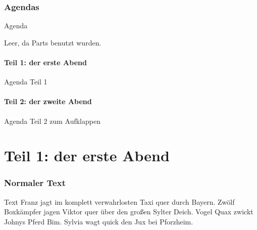 	\section*{Agendas}

	\begin{frame}{Agenda}
		\tableofcontents

		Leer, da Parts benutzt wurden.
	\end{frame}


	\subsection*{Teil 1: der erste Abend}

	\begin{frame}{Agenda Teil 1}
		\tableofcontents[part=1, subsectionstyle=hide]
	\end{frame}


	\subsection*{Teil 2: der zweite Abend}

	\begin{frame}{Agenda Teil 2 zum Aufklappen}
		\tableofcontents[part=2, pausesections]
	\end{frame}






	\part{Teil 1: der erste Abend}

	\frame{\partpage}

	\section{Normaler Text}

	\begin{frame}{Text}
		Franz jagt im komplett verwahrlosten Taxi quer durch Bayern.
		Zwölf Boxkämpfer jagen Viktor quer über den großen Sylter Deich.
		Vogel Quax zwickt Johnys Pferd Bim.
		Sylvia wagt quick den Jux bei Pforzheim.
	\end{frame}



